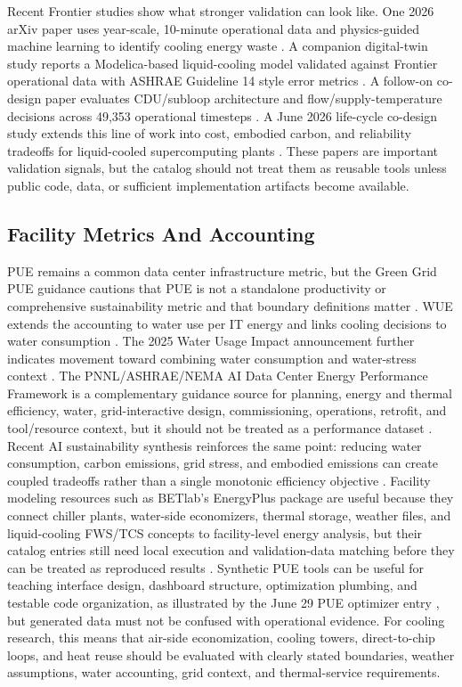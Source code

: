 \documentclass[11pt]{article}
\begin{document}
Recent Frontier studies show what stronger validation can look like. One 2026 arXiv paper uses year-scale, 10-minute operational data and physics-guided machine learning to identify cooling energy waste \cite{JadhavMLCooling2026}. A companion digital-twin study reports a Modelica-based liquid-cooling model validated against Frontier operational data with ASHRAE Guideline 14 style error metrics \cite{JadhavDigitalTwin2026}. A follow-on co-design paper evaluates CDU/subloop architecture and flow/supply-temperature decisions across 49,353 operational timesteps \cite{JadhavCoDesign2026}. A June 2026 life-cycle co-design study extends this line of work into cost, embodied carbon, and reliability tradeoffs for liquid-cooled supercomputing plants \cite{JadhavLifeCycle2026}. These papers are important validation signals, but the catalog should not treat them as reusable tools unless public code, data, or sufficient implementation artifacts become available.

\subsection{Facility Metrics And Accounting}

PUE remains a common data center infrastructure metric, but the Green Grid PUE guidance cautions that PUE is not a standalone productivity or comprehensive sustainability metric and that boundary definitions matter \cite{GreenGridPUE2012}. WUE extends the accounting to water use per IT energy and links cooling decisions to water consumption \cite{GreenGridWUE2011}. The 2025 Water Usage Impact announcement further indicates movement toward combining water consumption and water-stress context \cite{GreenGridWUI2025}. The PNNL/ASHRAE/NEMA AI Data Center Energy Performance Framework is a complementary guidance source for planning, energy and thermal efficiency, water, grid-interactive design, commissioning, operations, retrofit, and tool/resource context, but it should not be treated as a performance dataset \cite{ASHRAEAIDCFramework2026}. Recent AI sustainability synthesis reinforces the same point: reducing water consumption, carbon emissions, grid stress, and embodied emissions can create coupled tradeoffs rather than a single monotonic efficiency objective \cite{ChienAISustainability2026}. Facility modeling resources such as BETlab's EnergyPlus package are useful because they connect chiller plants, water-side economizers, thermal storage, weather files, and liquid-cooling FWS/TCS concepts to facility-level energy analysis, but their catalog entries still need local execution and validation-data matching before they can be treated as reproduced results \cite{BETlabDataCenterModeling2026}. Synthetic PUE tools can be useful for teaching interface design, dashboard structure, optimization plumbing, and testable code organization, as illustrated by the June 29 PUE optimizer entry \cite{DataCenterPUEOptimizer2026}, but generated data must not be confused with operational evidence. For cooling research, this means that air-side economization, cooling towers, direct-to-chip loops, and heat reuse should be evaluated with clearly stated boundaries, weather assumptions, water accounting, grid context, and thermal-service requirements.
\end{document}
